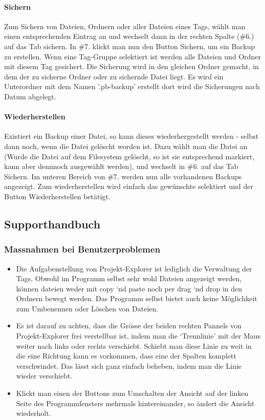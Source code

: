 \documentclass[10pt,paper=a4,final]{scrartcl}
\begin{document}
\paragraph{Sichern}
Zum Sichern von Dateien, Ordnern oder aller Dateien eines Tags, w\"ahlt man einen entsprechenden Eintrag an und wechselt dann in der rechten Spalte (\#6.) auf das Tab sichern. In \#7. klickt man nun den Button Sichern, um ein Backup zu erstellen. Wenn eine Tag-Gruppe selektiert ist werden alle Dateien und Ordner mit diesem Tag gesichert. Die Sicherung wird in den gleichen Ordner gemacht, in dem der zu sicherne Ordner oder zu sichernde Datei liegt. Es wird ein Unterordner mit dem Namen '.pb-backup' erstellt dort wird die Sicherungen nach Datum abgelegt.
\paragraph{Wiederherstellen}
Existiert ein Backup einer Datei, so kann dieses wiederhergestellt werden - selbst dann noch, wenn die Datei gel\"oscht worden ist. Dazu w\"ahlt man die Datei an (Wurde die Datei auf dem Filesystem gel\"oscht, so ist sie entsprechend markiert, kann aber dennnoch ausgew\"ahlt werden), und wechselt in \#6. auf das Tab Sichern. Im unteren Bereich von \#7. werden nun alle vorhandenen Backups angezeigt. Zum wiederherstellen wird einfach das gew\"unschte selektiert und der Button Wiederherstellen bet\"atigt.
\subsection{Supporthandbuch}
\subsubsection{Massnahmen bei Benutzerproblemen}
\begin{itemize}
  \item Die Aufgabenstellung von Projekt-Explorer ist lediglich die Verwaltung der Tags. Obwohl im Programm selbst sehr wohl Dateien angezeigt werden, k\"onnen dateien weder mit copy ‘nd paste noch per drag ‘nd drop in den Ordnern bewegt werden. Das Programm selbst bietet auch keine M\"oglichkeit zum Umbenennen oder L\"oschen von Dateien.
  \item Es ist darauf zu achten, dass die Gr\"osse der beiden rechten Pannels von Projekt-Explorer frei verstellbar ist, indem man die ‘Trennlinie’ mit der Maus weiter nach links oder rechts verschiebt. Schiebt man diese Linie zu weit in die eine Richtung kann es vorkommen, dass eine der Spalten komplett verschwindet. Das l\"asst sich ganz einfach beheben, indem man die Linie wieder verschiebt.
  \item Klickt man einen der Buttons zum Umschalten der Ansicht auf der linken Seite des Programmfensters mehrmals hintereinander, so \"andert die Ansicht wiederholt.
\end{itemize}
\end{document}
